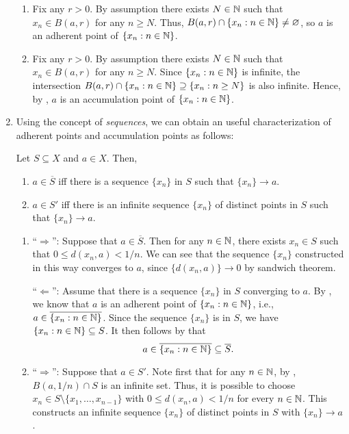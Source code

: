 \begin{enumerate}
\begin{pf}
\begin{enumerate}
\item Fix any \(r>0\). By assumption there exists \(N\in\mathbb{N}\) such that \(x_n\in
B(a,r)\) for any \(n\ge N\). Thus, \(B(a,r)\cap\{x_n:n\in\mathbb{N}\}\ne\varnothing\),
so \(a\) is an adherent point of \(\{x_n:n\in\mathbb{N}\}\).

\item Fix any \(r>0\). By assumption there exists \(N\in\mathbb{N}\) such that \(x_n\in
B(a,r)\) for any \(n\ge N\). Since \(\{x_n:n\in\mathbb{N}\}\) is infinite, the
intersection \(B(a,r)\cap\{x_n:n\in\mathbb{N}\}\supseteq \{x_n:n\ge N\}\) is also
infinite. Hence, by , \(a\) is an accumulation point
of \(\{x_n:n\in\mathbb{N}\}\).
\end{enumerate}
\end{pf}
\item Using the concept of \emph{sequences}, we can obtain an useful
characterization of adherent points and accumulation points as follows:
\begin{proposition}
\label{prp:adher-accum-seq-equiv}
Let \(S\subseteq X\) and \(a\in X\). Then,
\begin{enumerate}
\item \(a\in\overline{S}\) iff there is a sequence \(\{x_n\}\) in \(S\) such
that \(\{x_n\}\to a\).
\item \(a\in S'\) iff there is an infinite sequence \(\{x_n\}\) of distinct
points in \(S\) such that \(\{x_n\}\to a\).
\end{enumerate}
\end{proposition}
\begin{pf}
\begin{enumerate}
\item ``\(\Rightarrow\)'': Suppose that \(a\in \overline{S}\). Then for any
\(n\in\mathbb{N}\), there exists \(x_n\in S\) such that \(
0\le d(x_n,a)<1/n\). We can see that the sequence \(\{x_n\}\) constructed in
this way converges to \(a\), since \(\{d(x_n,a)\}\to 0\) by sandwich theorem.

``\(\Leftarrow\)'': Assume that there is a sequence \(\{x_n\}\) in \(S\)
converging to \(a\). By , we know that \(a\) is an
adherent point of \(\{x_n:n\in\mathbb{N}\}\), i.e., \(a\in\overline{\{x_n:n\in\mathbb{N}\}}\).
Since the sequence \(\{x_n\}\) is in \(S\), we have \(\{x_n:n\in\mathbb{N}\}\subseteq
S\). It then follows by  that
\[a\in\overline{\{x_n:n\in\mathbb{N}\}}\subseteq \overline{S}.\]

\item ``\(\Rightarrow\)'': Suppose that \(a\in S'\). Note first that for any
\(n\in\mathbb{N}\), by , \(B(a,1/n)\cap S\) is an infinite
set. Thus, it is possible to choose \(x_n\in S\setminus
\{x_1,\dotsc,x_{n-1}\}\) with \(0\le d(x_n,a)<1/n\) for
every \(n\in\mathbb{N}\). This constructs an infinite sequence \(\{x_n\}\) of distinct
points in \(S\) with \(\{x_n\}\to a\).


\end{enumerate}
\end{pf}
\end{enumerate}
